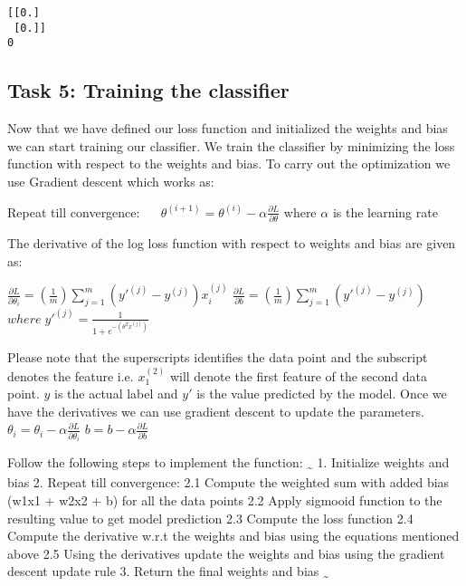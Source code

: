\documentclass[11pt]{article}
\begin{document}
    \begin{Verbatim}[commandchars=\\\{\}]
[[0.]
 [0.]]
0

    \end{Verbatim}

    \subsection{Task 5: Training the
classifier}\label{task-5-training-the-classifier}

Now that we have defined our loss function and initialized the weights
and bias we can start training our classifier. We train the classifier
by minimizing the loss function with respect to the weights and bias. To
carry out the optimization we use Gradient descent which works as:

Repeat till convergence:  
\(\theta^{(i+1)} = \theta^{(i)} - \alpha\frac{\partial L}{\partial \theta}\)
where \(\alpha\) is the learning rate

The derivative of the log loss function with respect to weights and bias
are given as:

\(\frac{\partial L}{\partial \theta_{i}} = (\frac{1}{m})\sum_{j = 1}^{m}{(y'^{(j)} - y^{(j)})x_i^{(j)}}\)
\(\frac{\partial L}{\partial b} = (\frac{1}{m})\sum_{j = 1}^{m}{(y'^{(j)} - y^{(j)})}\)
\(where \; y'^{(j)} = \frac{1}{1 + e^{-(\theta^{T}x^{(j)})}}\)

Please note that the superscripts identifies the data point and the
subscript denotes the feature i.e. \(x_{1}^{(2)}\) will denote the first
feature of the second data point. \(y\) is the actual label and \(y'\)
is the value predicted by the model. Once we have the derivatives we can
use gradient descent to update the parameters.
\(\theta_{i} = \theta_{i} - \alpha\frac{\partial L}{\partial \theta_i}\)
\(b = b - \alpha\frac{\partial L}{\partial b}\)

Follow the following steps to implement the function:
\textsubscript{\textasciitilde{}} 1. Initialize weights and bias 2.
Repeat till convergence: 2.1 Compute the weighted sum with added bias
(w1x1 + w2x2 + b) for all the data points 2.2 Apply sigmooid function to
the resulting value to get model prediction 2.3 Compute the loss
function 2.4 Compute the derivative w.r.t the weights and bias using the
equations mentioned above 2.5 Using the derivatives update the weights
and bias using the gradient descent update rule 3. Return the final
weights and bias \textsubscript{\textasciitilde{}}
\end{document}
